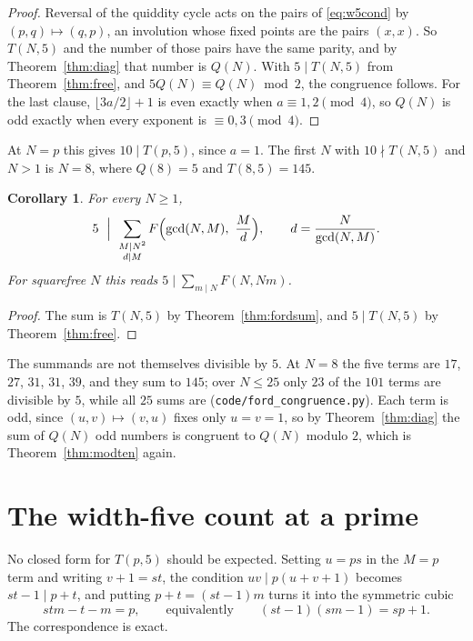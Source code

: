 \documentclass[11pt]{article}
\theoremstyle{plain}
\newtheorem{corollary}[theorem]{Corollary}
\theoremstyle{definition}
\begin{document}
\begin{proof}
Reversal of the quiddity cycle acts on the pairs of \eqref{eq:w5cond} by $(p,q)\mapsto(q,p)$,
an involution whose fixed points are the pairs $(x,x)$. So $T(N,5)$ and the number of those
pairs have the same parity, and by Theorem~\ref{thm:diag} that number is $Q(N)$. With
$5\mid T(N,5)$ from Theorem~\ref{thm:free}, and $5Q(N)\equiv Q(N)\bmod 2$, the congruence
follows. For the last clause, $\lfloor 3a/2\rfloor+1$ is even exactly when $a\equiv1,2
\pmod 4$, so $Q(N)$ is odd exactly when every exponent is $\equiv0,3\pmod4$.
\end{proof}

At $N=p$ this gives $10\mid T(p,5)$, since $a=1$. The first $N$ with $10\nmid T(N,5)$ and
$N>1$ is $N=8$, where $Q(8)=5$ and $T(8,5)=145$.

\begin{corollary}\label{cor:fivedvd}
For every $N\ge1$,
\[
  5\ \Bigm|\ \sum_{\substack{M\mid N^{2}\\ d\mid M}} F\Bigl(\gcd(N,M),\ \frac{M}{d}\Bigr),
  \qquad d=\frac{N}{\gcd(N,M)} .
\]
For squarefree $N$ this reads $5\mid\sum_{m\mid N}F(N,Nm)$.
\end{corollary}

\begin{proof}
The sum is $T(N,5)$ by Theorem~\ref{thm:fordsum}, and $5\mid T(N,5)$ by
Theorem~\ref{thm:free}.
\end{proof}

The summands are not themselves divisible by $5$. At $N=8$ the five terms are $17$, $27$,
$31$, $31$, $39$, and they sum to $145$; over $N\le25$ only $23$ of the $101$ terms are
divisible by $5$, while all $25$ sums are (\texttt{code/ford\_congruence.py}). Each term is
odd, since $(u,v)\mapsto(v,u)$ fixes only $u=v=1$, so by Theorem~\ref{thm:diag} the sum of
$Q(N)$ odd numbers is congruent to $Q(N)$ modulo $2$, which is Theorem~\ref{thm:modten}
again.

\section{The width-five count at a prime}\label{sec:prime}

No closed form for $T(p,5)$ should be expected. Setting $u=ps$ in the $M=p$ term and
writing $v+1=st$, the condition $uv\mid p(u+v+1)$ becomes $st-1\mid p+t$, and putting
$p+t=(st-1)m$ turns it into the symmetric cubic
\begin{equation}\label{eq:cubic}
  stm-t-m=p, \qquad\text{equivalently}\qquad (st-1)(sm-1)=sp+1 .
\end{equation}
The correspondence is exact.
\end{document}
